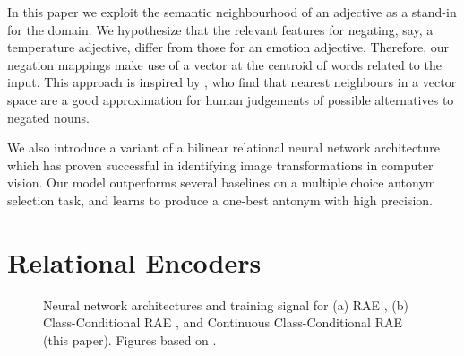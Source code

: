 \documentclass[11pt]{article}
\begin{document}
In this paper we exploit the semantic neighbourhood of an adjective
as a stand-in for the domain. We hypothesize that the relevant
features for negating, say, a temperature adjective, differ from those
for an emotion adjective. Therefore, our negation mappings make use of a
vector at the centroid of words related to the input.
This approach is inspired by \citet{kruszewski:16},
 who find that nearest neighbours in a vector space are a good approximation for human judgements of possible alternatives to negated nouns.

We also introduce a variant of a bilinear relational neural network architecture which has proven successful in 
identifying image transformations in computer vision. Our model outperforms several baselines on a
multiple choice antonym selection task, and learns to produce a
one-best antonym with high precision.


\section{Relational Encoders}

\begin{figure}[h!t]
\centering
{}
\quad
{}
\quad
{}
\label{f:arch}
\vspace{-4mm}
\caption{Neural network architectures and training signal for (a) RAE \citep{memisevic:13}, (b) Class-Conditional RAE \citet{rudy:15}, and Continuous Class-Conditional RAE (this paper). Figures based on \citet{memisevic:13}.}
\end{figure}
\end{document}
